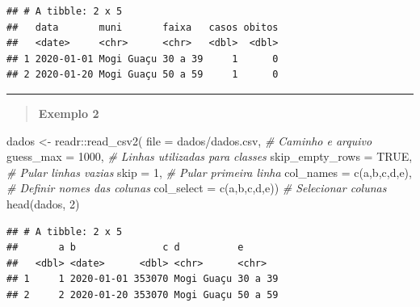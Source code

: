 \documentclass[
]{book}
\newenvironment{Shaded}{\begin{snugshade}}{\end{snugshade}}
\newcommand{\AttributeTok}[1]{\textcolor[rgb]{0.77,0.63,0.00}{#1}}
\newcommand{\CommentTok}[1]{\textcolor[rgb]{0.56,0.35,0.01}{\textit{#1}}}
\newcommand{\ConstantTok}[1]{\textcolor[rgb]{0.00,0.00,0.00}{#1}}
\newcommand{\DecValTok}[1]{\textcolor[rgb]{0.00,0.00,0.81}{#1}}
\newcommand{\FunctionTok}[1]{\textcolor[rgb]{0.00,0.00,0.00}{#1}}
\newcommand{\NormalTok}[1]{#1}
\newcommand{\OtherTok}[1]{\textcolor[rgb]{0.56,0.35,0.01}{#1}}
\newcommand{\SpecialCharTok}[1]{\textcolor[rgb]{0.00,0.00,0.00}{#1}}
\newcommand{\StringTok}[1]{\textcolor[rgb]{0.31,0.60,0.02}{#1}}
\theoremstyle{definition}
\theoremstyle{definition}
\theoremstyle{definition}
\theoremstyle{definition}
\theoremstyle{remark}
\begin{document}
\begin{verbatim}
## # A tibble: 2 x 5
##   data       muni       faixa   casos obitos
##   <date>     <chr>      <chr>   <dbl>  <dbl>
## 1 2020-01-01 Mogi Guaçu 30 a 39     1      0
## 2 2020-01-20 Mogi Guaçu 50 a 59     1      0
\end{verbatim}

\begin{center}\rule{0.5\linewidth}{0.5pt}\end{center}

\begin{quote}
\textbf{Exemplo 2}
\end{quote}

\begin{Shaded}
\begin{Highlighting}[]
\NormalTok{dados }\OtherTok{\textless{}{-}}\NormalTok{ readr}\SpecialCharTok{::}\FunctionTok{read\_csv2}\NormalTok{(}
              \AttributeTok{file =} \StringTok{\textquotesingle{}dados/dados.csv\textquotesingle{}}\NormalTok{,   }\CommentTok{\# Caminho e arquivo}
              \AttributeTok{guess\_max =} \DecValTok{1000}\NormalTok{,           }\CommentTok{\# Linhas utilizadas para classes}
              \AttributeTok{skip\_empty\_rows =} \ConstantTok{TRUE}\NormalTok{,     }\CommentTok{\# Pular linhas vazias}
              \AttributeTok{skip =} \DecValTok{1}\NormalTok{,                   }\CommentTok{\# Pular primeira linha}
              \AttributeTok{col\_names =} \FunctionTok{c}\NormalTok{(}\StringTok{\textquotesingle{}a\textquotesingle{}}\NormalTok{,}\StringTok{\textquotesingle{}b\textquotesingle{}}\NormalTok{,}\StringTok{\textquotesingle{}c\textquotesingle{}}\NormalTok{,}\StringTok{\textquotesingle{}d\textquotesingle{}}\NormalTok{,}\StringTok{\textquotesingle{}e\textquotesingle{}}\NormalTok{),   }\CommentTok{\# Definir nomes das colunas}
              \AttributeTok{col\_select =} \FunctionTok{c}\NormalTok{(}\StringTok{\textquotesingle{}a\textquotesingle{}}\NormalTok{,}\StringTok{\textquotesingle{}b\textquotesingle{}}\NormalTok{,}\StringTok{\textquotesingle{}c\textquotesingle{}}\NormalTok{,}\StringTok{\textquotesingle{}d\textquotesingle{}}\NormalTok{,}\StringTok{\textquotesingle{}e\textquotesingle{}}\NormalTok{))  }\CommentTok{\# Selecionar colunas}
\FunctionTok{head}\NormalTok{(dados, }\DecValTok{2}\NormalTok{)}
\end{Highlighting}
\end{Shaded}

\begin{verbatim}
## # A tibble: 2 x 5
##       a b               c d          e      
##   <dbl> <date>      <dbl> <chr>      <chr>  
## 1     1 2020-01-01 353070 Mogi Guaçu 30 a 39
## 2     2 2020-01-20 353070 Mogi Guaçu 50 a 59
\end{verbatim}
\end{document}
